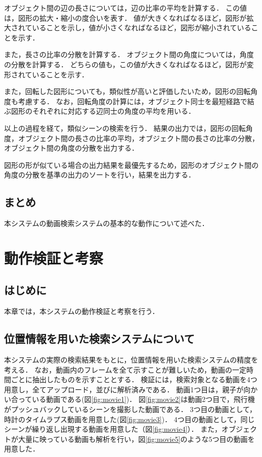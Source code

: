 \documentclass[a4j,12pt,dvipdfmx]{jreport}
\begin{document}
オブジェクト間の辺の長さについては，辺の比率の平均を計算する．
この値は，図形の拡大・縮小の度合いを表す．
値が大きくなればなるほど，図形が拡大されていることを示し，値が小さくなればなるほど，図形が縮小されていることを示す．

また，長さの比率の分散を計算する．
オブジェクト間の角度については，角度の分散を計算する．
どちらの値も，この値が大きくなればなるほど，図形が変形されていることを示す．

また，回転した図形についても，類似性が高いと評価したいため，図形の回転角度も考慮する．
なお，回転角度の計算には，オブジェクト同士を最短経路で結ぶ図形のそれぞれに対応する辺同士の角度の平均を用いる．

以上の過程を経て，類似シーンの検索を行う．
結果の出力では，図形の回転角度，オブジェクト間の長さの比率の平均，オブジェクト間の長さの比率の分散，オブジェクト間の角度の分散を出力する．

図形の形が似ている場合の出力結果を最優先するため，図形のオブジェクト間の角度の分散を基準の出力のソートを行い，結果を出力する．



\section{まとめ}\label{chap:3-6}
本システムの動画検索システムの基本的な動作について述べた．

\clearpage

\chapter{動作検証と考察}
\label{sec:consideration}

\section{はじめに}\label{chap4-1}
本章では，本システムの動作検証と考察を行う．

\section{位置情報を用いた検索システムについて}\label{chap4-2}
本システムの実際の検索結果をもとに，位置情報を用いた検索システムの精度を考える．
なお，動画内のフレームを全て示すことが難しいため，動画の一定時間ごとに抽出したものを示すこととする．
検証には，検索対象となる動画を4つ用意し，全てアップロード，並びに解析済みである．
動画1つ目は，親子が向かい合っている動画である(図\ref{fig:movie1})．
図\ref{fig:movie2}は動画2つ目で，飛行機がプッシュバックしているシーンを撮影した動画である．
3つ目の動画として，時計のタイムラプス動画を用意した(図\ref{fig:movie3})．
4つ目の動画として，同じシーンが繰り返し出現する動画を用意した（図\ref{fig:movie4}）．
また，オブジェクトが大量に映っている動画も解析を行い，図\ref{fig:movie5}のような5つ目の動画を用意した．
\end{document}
